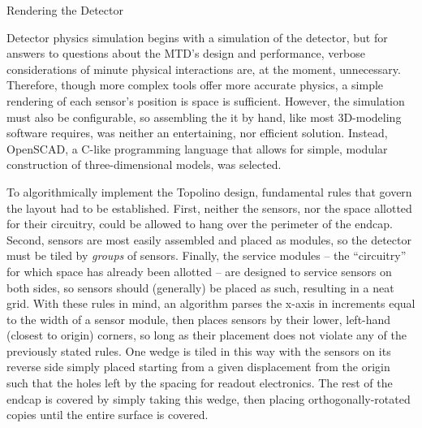 \begin{section}{Rendering the Detector}

Detector physics simulation begins with a simulation of the detector, but for answers to questions about the MTD's design and performance, verbose considerations of minute physical interactions are, at the moment, unnecessary. Therefore, though more complex tools offer more accurate physics, a simple rendering of each sensor's position is space is sufficient. However, the simulation must also be configurable, so assembling the it by hand, like most 3D-modeling software requires, was neither an entertaining, nor efficient solution. Instead, OpenSCAD, a C-like programming language that allows for simple, modular construction of three-dimensional models, was selected.

To algorithmically implement the Topolino design, fundamental rules that govern the layout had to be established. First, neither the sensors, nor the space allotted for their circuitry, could be allowed to hang over the perimeter of the endcap. Second, sensors are most easily assembled and placed as modules, so the detector must be tiled by \textit{groups} of sensors. Finally, the service modules -- the ``circuitry'' for which space has already been allotted -- are designed to service sensors on both sides, so sensors should (generally) be placed as such, resulting in a neat grid. With these rules in mind, an algorithm parses the x-axis in increments equal to the width of a sensor module, then places sensors by their lower, left-hand (closest to origin) corners, so long as their placement does not violate any of the previously stated rules. One wedge is tiled in this way with the sensors on its reverse side simply placed starting from a given displacement from the origin such that the holes left by the spacing for readout electronics. The rest of the endcap is covered by simply taking this wedge, then placing orthogonally-rotated copies until the entire surface is covered.


\end{section}
